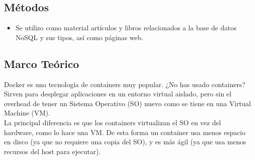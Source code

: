 \documentclass[twoside,onecolumn]{article}
\begin{document}
\subsection{Métodos}
	\begin{itemize}
		\item Se utilizo como material artículos y libros relacionados a la base de datos NoSQL y sus tipos, así como páginas web.
	\end{itemize}
\begin{flushright}
\begin{itemize}

\section{Marco Teórico}

Docker es una tecnología de containers muy popular.
¿No has usado containers? Sirven para desplegar aplicaciones en un entorno virtual aislado, pero sin el overhead de tener un Sistema Operativo (SO) nuevo como se tiene en una Virtual Machine (VM).\textbf{}\\
La principal diferencia es que los containers virtualizan el SO en vez del hardware, como lo hace una VM. De esta forma un container usa menos espacio en disco (ya que no requiere una copia del SO), y es más ágil (ya que usa menos recursos del host para ejecutar).

\textbf{}\\

\end{itemize}
\end{flushright}
\end{document}
